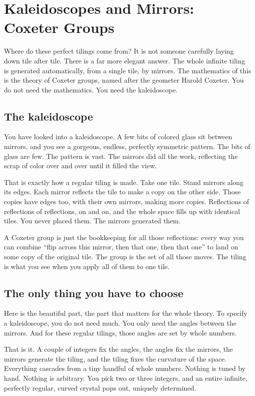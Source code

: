 \section{Kaleidoscopes and Mirrors: Coxeter Groups}

Where do these perfect tilings come from? It is not someone carefully laying down tile after tile. There is a far more elegant answer. The whole infinite tiling is generated automatically, from a single tile, by mirrors. The mathematics of this is the theory of Coxeter groups, named after the geometer Harold Coxeter. You do not need the mathematics. You need the kaleidoscope.

\subsection{The kaleidoscope}

You have looked into a kaleidoscope. A few bits of colored glass sit between mirrors, and you see a gorgeous, endless, perfectly symmetric pattern. The bits of glass are few. The pattern is vast. The mirrors did all the work, reflecting the scrap of color over and over until it filled the view.

That is exactly how a regular tiling is made. Take one tile. Stand mirrors along its edges. Each mirror reflects the tile to make a copy on the other side. Those copies have edges too, with their own mirrors, making more copies. Reflections of reflections of reflections, on and on, and the whole space fills up with identical tiles. You never placed them. The mirrors generated them.

A Coxeter group is just the bookkeeping for all those reflections: every way you can combine ``flip across this mirror, then that one, then that one'' to land on some copy of the original tile. The group is the set of all those moves. The tiling is what you see when you apply all of them to one tile.

\subsection{The only thing you have to choose}

Here is the beautiful part, the part that matters for the whole theory. To specify a kaleidoscope, you do not need much. You only need the angles between the mirrors. And for these regular tilings, those angles are set by whole numbers.

That is it. A couple of integers fix the angles, the angles fix the mirrors, the mirrors generate the tiling, and the tiling fixes the curvature of the space. Everything cascades from a tiny handful of whole numbers. Nothing is tuned by hand. Nothing is arbitrary. You pick two or three integers, and an entire infinite, perfectly regular, curved crystal pops out, uniquely determined.

